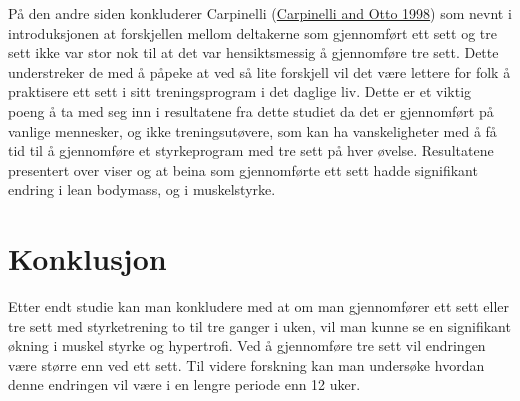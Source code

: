\documentclass[
]{book}
\begin{document}
På den andre siden konkluderer Carpinelli
(\protect\hyperlink{ref-carpinelli1998}{Carpinelli and Otto 1998}) som
nevnt i introduksjonen at forskjellen mellom deltakerne som gjennomført
ett sett og tre sett ikke var stor nok til at det var hensiktsmessig å
gjennomføre tre sett. Dette understreker de med å påpeke at ved så lite
forskjell vil det være lettere for folk å praktisere ett sett i sitt
treningsprogram i det daglige liv. Dette er et viktig poeng å ta med seg
inn i resultatene fra dette studiet da det er gjennomført på vanlige
mennesker, og ikke treningsutøvere, som kan ha vanskeligheter med å få
tid til å gjennomføre et styrkeprogram med tre sett på hver øvelse.
Resultatene presentert over viser og at beina som gjennomførte ett sett
hadde signifikant endring i lean bodymass, og i muskelstyrke.

\hypertarget{konklusjon}{%
\section{Konklusjon}\label{konklusjon}}

Etter endt studie kan man konkludere med at om man gjennomfører ett sett
eller tre sett med styrketrening to til tre ganger i uken, vil man kunne
se en signifikant økning i muskel styrke og hypertrofi. Ved å
gjennomføre tre sett vil endringen være større enn ved ett sett. Til
videre forskning kan man undersøke hvordan denne endringen vil være i en
lengre periode enn 12 uker.
\end{document}
